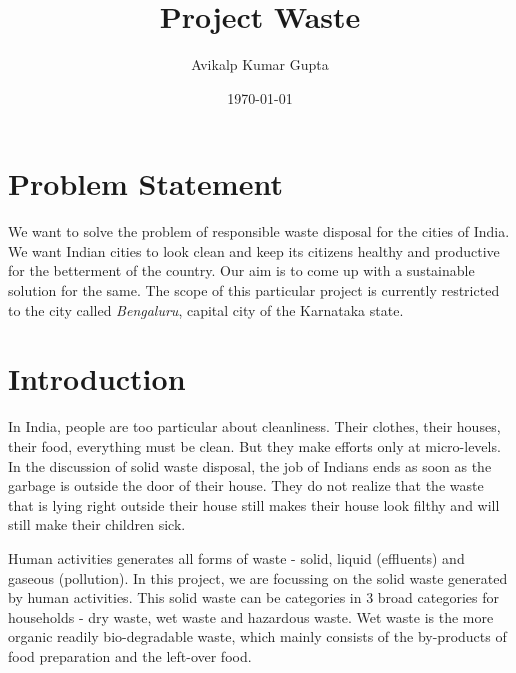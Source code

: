 \documentclass[10pt]{article}
\title{Project Waste}
\author{Avikalp Kumar Gupta}
\date{\today}
\begin{document}
\maketitle

\tableofcontents

\pagebreak

\begin{abstract}



\end{abstract}

\section{Problem Statement}

We want to solve the problem of responsible waste disposal for the cities of India. We want Indian cities to look clean and keep its citizens healthy and productive for the betterment of the country. Our aim is to come up with a sustainable solution for the same. The scope of this particular project is currently restricted to the city called \emph{Bengaluru}, capital city of the Karnataka state. 

\section{Introduction}

In India, people are too particular about cleanliness. Their clothes, their houses, their food, everything must be clean. But they make efforts only at micro-levels. In the discussion of solid waste disposal, the job of Indians ends as soon as the garbage is outside the door of their house. They do not realize that the waste that is lying right outside their house still makes their house look filthy and will still make their children sick. 

Human activities generates all forms of waste - solid, liquid (effluents) and gaseous (pollution). In this project, we are focussing on the solid waste generated by human activities. This solid waste can be categories in 3 broad categories for households - dry waste, wet waste and hazardous waste. Wet waste is the more organic readily bio-degradable waste, which mainly consists of the by-products of food preparation and the left-over food.
\end{document}
